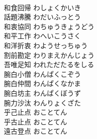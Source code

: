 \documentclass[8pt]{extreport}
\begin{document}
\begin{CJK}{UTF8}{min}
\\	和食回帰	わしょくかいき	
\\	話題沸騰	わだいふっとう	
\\	和衷協同	わちゅうきょうどう	
\\	和平工作	わへいこうさく	
\\	和洋折衷	わようせっちゅう	
\\	割前勘定	わりまえかんじょう	
\\	吾唯足知	われただたるをしる	
\\	腕白小僧	わんぱくこぞう	
\\	腕白仲間	わんぱくなかま	
\\	腕白坊主	わんぱくぼうず	
\\	腕力沙汰	わんりょくざた	
\\	乎己止点	おことてん	
\\	乎古止点	おことてん	
\\	遠古登点	おことてん	
\end{CJK}
\end{document}

